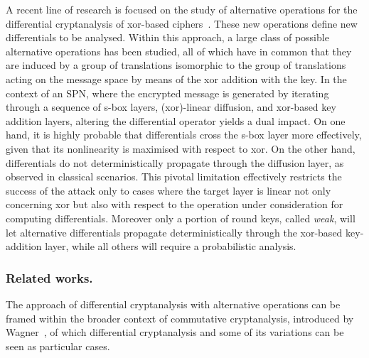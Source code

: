 \documentclass[runningheads,a4paper,english]{llncs}
\begin{document}
A recent line of research is focused on the study of alternative operations for the differential cryptanalysis of xor-based ciphers~\cite{civino2019differential,calderini2021properties,tecseleanu2022security,nexexp,baudrin2023commutative}. These new operations define new differentials to be analysed. Within this approach, a large class of possible alternative operations has been studied, all of which have in common that they are induced by a group of translations isomorphic to the group of translations acting on the message space by means of the xor addition with the key.
In the context of an SPN, where the encrypted message is generated by iterating through a sequence of s-box layers, (xor)-linear diffusion, and xor-based key addition layers, altering the differential operator yields a dual impact. On one hand, it is highly probable that differentials cross the s-box layer more effectively, given that its nonlinearity is maximised with respect to xor. On the other hand, differentials do not deterministically propagate through the diffusion layer, as observed in classical scenarios. This pivotal limitation effectively restricts the success of the attack only to cases where the target layer is linear not only concerning xor but also with respect to the operation under consideration for computing differentials.
Moreover only a portion of round keys, called \emph{weak}, will let alternative differentials propagate deterministically through the xor-based key-addition layer, while all others  will require a probabilistic analysis.

\subsubsection*{Related works.}
The approach of differential cryptanalysis with alternative operations can be framed within the broader context of commutative cryptanalysis, introduced by Wagner~\cite{wagner2004towards}, of which differential cryptanalysis and some of its variations can be seen as particular cases.\\
\end{document}

